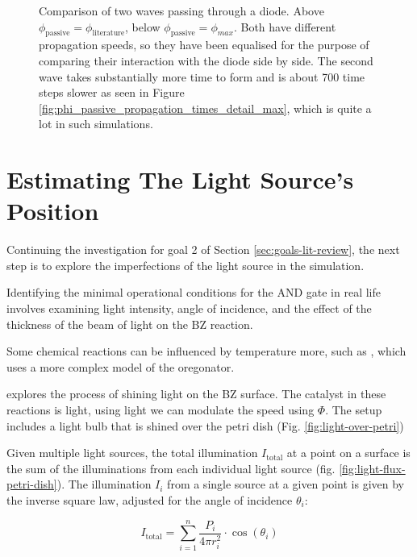 \begin{figure}
	\caption{Comparison of two waves passing through a diode. Above $\phi_{\text{passive}} = \phi_{\text{literature}}$, below $\phi_{\text{passive}} = \phi_{max}$. Both have different propagation speeds, so they have been equalised for the purpose of comparing their interaction with the diode side by side. The second wave takes substantially more time to form and is about 700 time steps slower as seen in Figure \ref{fig:phi_passive_propagation_times_detail_max}, which is quite a lot in such simulations.}
	\label{fig:comparison_diode}
\end{figure}

\section{Estimating The Light Source's Position}\label{sec:light-imperfections}

Continuing the investigation for goal 2 of Section \ref{sec:goals-lit-review}, the next step is to explore the imperfections of the light source in the simulation.

Identifying the minimal operational conditions for the AND gate in real life involves examining light intensity, angle of incidence, and the effect of the thickness of the beam of light on the BZ reaction.

Some chemical reactions can be influenced by temperature more, such as \cite{yamada2022artificial}, which uses a more complex model of the oregonator.


\citep{barry1979methods} explores the process of shining light on the BZ surface.
The catalyst in these reactions is light, using light we can modulate the speed using $\Phi$.
The setup includes a light bulb that is shined over the petri dish (Fig. \ref{fig:light-over-petri})

Given multiple light sources, the total illumination $I_{\text{total}}$ at a point on a surface is the sum of the illuminations from each individual light source (fig. \ref{fig:light-flux-petri-dish}). The illumination $I_i$ from a single source at a given point is given by the inverse square law, adjusted for the angle of incidence $\theta_i$:

\[
I_{\text{total}} = \sum_{i=1}^{n} \frac{P_i}{4\pi r_i^2} \cdot \cos(\theta_i)
\]

